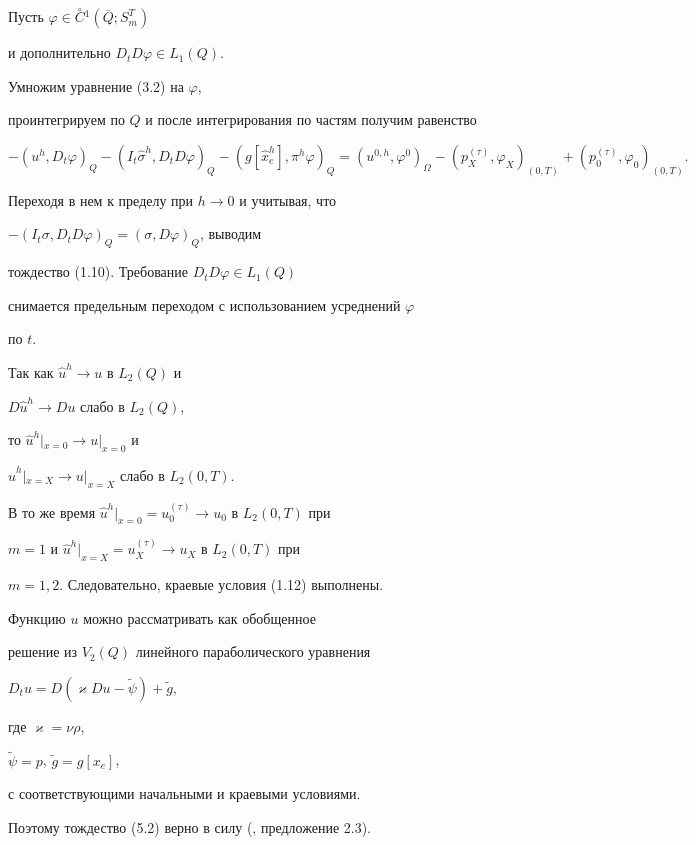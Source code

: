\documentclass[12pt]{article}
\theoremstyle{plain} %
\theoremstyle{definition}
\numberwithin{equation}{section}
\begin{document}
\begin{pf} Пусть $\varphi\in \overset{\circ}{C}{}^1(\overline Q;S_m^T)$


и дополнительно $D_tD\varphi\in L_1(Q)$.


Умножим уравнение (3.2) на $\varphi$,


проинтегрируем по $Q$ и после интегрирования по частям получим равенство


$$


-(u^h,D_t\varphi)_Q-(I_t\widehat \sigma^h,D_tD\varphi)_Q-


(g[\widehat x^h_e],\pi^h\varphi)_Q=(u^{0,h},\varphi^0)_{\Omega}-


(p^{(\tau)}_X,\varphi_X)_{(0,T)}+(p^{(\tau)}_0,\varphi_0)_{(0,T)}.


$$


Переходя в нем к пределу при $h\to 0$ и учитывая, что


$-(I_t\sigma,D_tD\varphi)_Q =(\sigma, D\varphi)_Q$, выводим


тождество (1.10). Требование $D_tD\varphi\in L_1(Q)$


снимается предельным переходом с использованием усреднений $\varphi$


по $t$.





Так как $\widehat u^h\to u$ в $L_2(Q)$ и


$D\widehat u^h\to Du$ слабо в $L_2(Q)$,


то $\widehat u^h|_{x=0}\to u|_{x=0}$ и


$\widehat u^h|_{x=X}\to u|_{x=X}$ слабо в $L_2(0,T)$.


В то же время $\widehat u^h|_{x=0}=u^{(\tau)}_0\to u_0$ в $L_2(0,T)$ при


$m=1$ и $\widehat u^h|_{x=X}=u^{(\tau)}_X\to u_X$ в $L_2(0,T)$ при


$m=1,2$. Следовательно, краевые условия (1.12) выполнены.





Функцию $u$ можно рассматривать как обобщенное


решение из $V_2(Q)$ линейного параболического уравнения


$D_tu=D(\varkappa Du -\widetilde\psi)+ \widetilde g,$


где $\varkappa =\nu\rho$,


$\widetilde\psi=p$, $\widetilde g = g[x_e]$,


с соответствующими начальными и краевыми условиями.


Поэтому тождество (5.2) верно в силу (\cite{Amo10}, предложение 2.3).


\end{pf}
\end{document}
